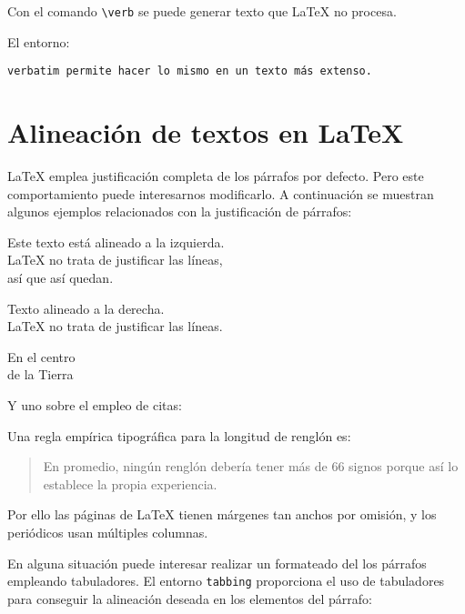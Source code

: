 \documentclass[11pt,a4paper]{article}
\begin{document}
\noindent Con el comando \verb+\verb+ se puede generar texto que \LaTeX{} no procesa.

El entorno:
\begin{verbatim}
verbatim permite hacer lo mismo en un texto más extenso.
\end{verbatim} 





\section{Alineación de textos en \LaTeX{}}
\label{sec:alinea} %

\LaTeX{} emplea justificación completa de los párrafos por defecto. Pero este comportamiento puede interesarnos modificarlo. A continuación se muestran algunos ejemplos relacionados con la justificación de párrafos:

\begin{flushleft}
	Este texto está alineado a la izquierda. \\
	\LaTeX{} no trata de justificar las líneas, \\
	así que así quedan.
\end{flushleft}

\begin{flushright}
	Texto alineado a la derecha. \\
	\LaTeX{} no trata de justificar las líneas.
\end{flushright}

\begin{center}
	En el centro\\
	de la Tierra
\end{center}

\noindent Y uno sobre el empleo de citas:

Una regla empírica tipográfica para la longitud de renglón es:

\begin{quote}
	En promedio, ningún renglón debería tener más de 66 signos porque así lo establece la propia experiencia.
\end{quote}

Por ello las páginas de \LaTeX{} tienen márgenes tan anchos por omisión, y los periódicos usan múltiples columnas. 

En alguna situación puede interesar realizar un formateado del los párrafos empleando tabuladores. El entorno \texttt{tabbing} proporciona el uso de tabuladores para conseguir la alineación deseada en los elementos del párrafo:
\end{document}
